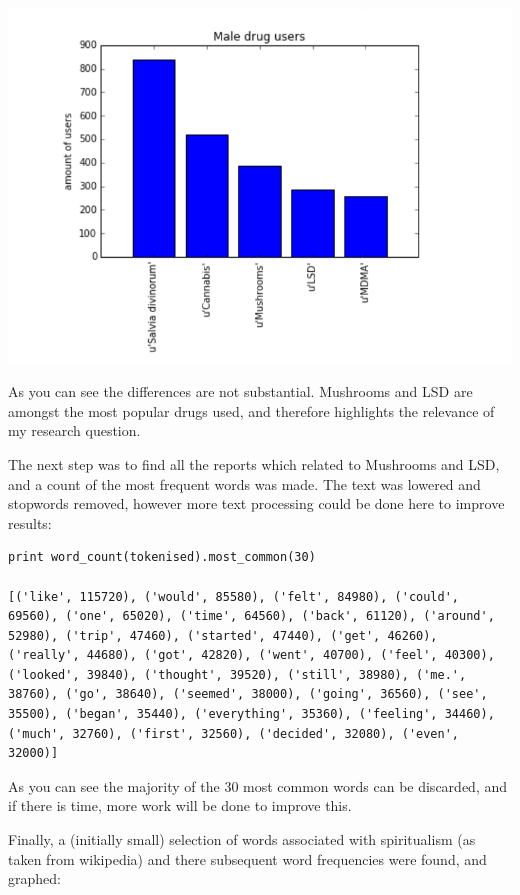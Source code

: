 \documentclass{article}
\begin{document}
\includegraphics{maledrugs_cropped2}

As you can see the differences are not substantial. Mushrooms and LSD are amongst the most popular drugs used, and therefore highlights the relevance of my research question. 

The next step was to find all the reports which related to Mushrooms and LSD, and a count of the most frequent words was made. The text was lowered and stopwords removed, however more text processing could be done here to improve results:

\begin{lstlisting}
print word_count(tokenised).most_common(30)

[('like', 115720), ('would', 85580), ('felt', 84980), ('could', 69560), ('one', 65020), ('time', 64560), ('back', 61120), ('around', 52980), ('trip', 47460), ('started', 47440), ('get', 46260), ('really', 44680), ('got', 42820), ('went', 40700), ('feel', 40300), ('looked', 39840), ('thought', 39520), ('still', 38980), ('me.', 38760), ('go', 38640), ('seemed', 38000), ('going', 36560), ('see', 35500), ('began', 35440), ('everything', 35360), ('feeling', 34460), ('much', 32760), ('first', 32560), ('decided', 32080), ('even', 32000)]
\end{lstlisting}

As you can see the majority of the 30 most common words can be discarded, and if there is time, more work will be done to improve this. 

Finally, a (initially small) selection of words associated with spiritualism (as taken from wikipedia) and there subsequent word frequencies were found, and graphed:
\end{document}
